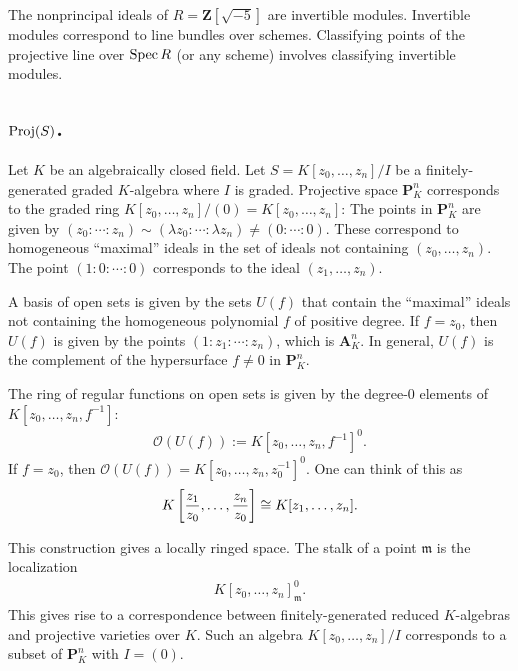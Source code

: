 \documentclass [11 pt, oneside] {article}
\begin{document}
\begin{remark}
	The nonprincipal ideals of $R=\mathbf{Z}[\sqrt{-5}] $ are invertible modules. Invertible modules correspond to line bundles over schemes. Classifying points of the projective line over $\operatorname{Spec} R$ (or any scheme) involves classifying invertible modules.
\end{remark}

\subsection{\texorpdfstring{$\operatorname{Proj}(S)$}{Proj (S)}.}
\label{Projc}
Let $K$ be an algebraically closed field. Let $S=K[z_0,\hdots, z_n]/I$ be a finitely-generated graded $K$-algebra where $I$ is graded. Projective space $\mathbf{P}^n_K$ corresponds to the graded ring $K[z_0,\hdots, z_n] /(0)= K[z_0,\hdots,z_n]$: The points in $\mathbf{P}^n_K$ are given by $(z_0:\cdots:z_n)\sim (\lambda z_0:\cdots:\lambda z_n)\ne (0:\cdots:0)$. These correspond to homogeneous ``maximal'' ideals in the set of ideals not containing $(z_0,\hdots,z_n)$. The point $(1:0:\cdots:0)$ corresponds to the ideal $(z_1,\hdots,z_n)$.

A basis of open sets is given by the sets $U(f)$ that contain the ``maximal'' ideals not containing the homogeneous polynomial $f$ of positive degree. If $f=z_0$, then $U(f)$ is given by the points $(1:z_1:\cdots:z_n)$, which is $\mathbf{A}^n_K$. In general, $U(f)$ is the complement of the hypersurface $f\ne 0$ in $\mathbf{P}^n_K$.

The ring of regular functions on open sets is given by the degree-$0$ elements of $K[z_0,\hdots, z_n,f^{-1}]$:
\begin{align*}
	\mathscr{O}(U(f)) := K[z_0,\hdots, z_n,f^{-1}]^0.
\end{align*}
If $f=z_0$, then $\mathscr{O}(U(f)) =K[z_0,\hdots, z_n,z_0^{-1}]^0$. One can think of this as
\begin{align*}
	K \left[ \frac{z_1}{z_0}, \hdots, \frac{z_n}{z_0} \right] \cong K[z_1,\hdots,z_n]. 
\end{align*}

This construction gives a locally ringed space. The stalk of a point $\mathfrak{m}$ is the localization
\begin{align*}
	K[z_0,\hdots, z_n]^0_{\mathfrak{m}}.
\end{align*}
This gives rise to a correspondence between finitely-generated reduced $K$-algebras and projective varieties over $K$. Such an algebra $K[z_0,\hdots, z_n]/I$ corresponds to a subset of $\mathbf{P}^n_K$ with $I=(0)$.
\end{document}
